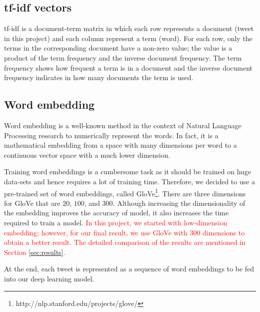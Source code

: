 \documentclass[8pt,conference,compsocconf]{IEEEtran}
\begin{document}
\subsection{tf-idf vectors}
tf-idf is a document-term matrix in which each row represents a document (tweet in this project) and each column represent a term (word). For each row, only the terms in the corresponding document have a non-zero value; the value is a product of the term frequency and the inverse document frequency. The term frequency shows how frequent a term is in a document and the inverse document frequency indicates in how many documents the term is used.
\subsection{Word embedding}
Word embedding is a well-known method in the context of Natural Language Processing research to numerically represent the words. In fact, it is a mathematical embedding from a space with many dimensions per word to a continuous vector space with a much lower dimension. 

Training word embeddings is a cumbersome task as it should be trained on huge data-sets and hence requires a lot of training time. Therefore, we decided to use a pre-trained set of word embeddings, called GloVe\footnote{http://nlp.stanford.edu/projects/glove/}. There are three dimensions for GloVe that are $20$, $100$, and $300$. Although increasing the dimensionality of the embedding improves the accuracy of model, it also increases the time required to train a model. \textcolor{red}{In this project, we started with low-dimension embedding; however, for our final result, we use GloVe with $300$ dimensions to obtain a better result. The detailed comparison of the results are mentioned in Section \ref{sec:results}.}

At the end, each tweet is represented as a sequence of word embeddings to be fed into our deep learning model.

\end{document}
